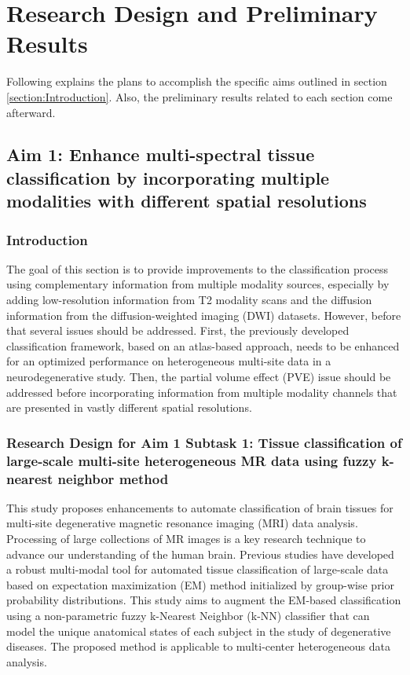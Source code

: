 \section{Research Design and Preliminary Results}
Following explains the plans to accomplish the specific aims outlined in section \ref{section:Introduction}. Also, the preliminary results related to each section come afterward.

\subsection{Aim 1: Enhance multi-spectral tissue classification by incorporating multiple modalities with different spatial resolutions}
\label{section:Aim1ResearchDesign}

\subsubsection{Introduction}
\label{section:Aim1Intro}
The goal of this section is to provide improvements to the classification process using complementary information from multiple modality sources, especially by adding low-resolution information from T2 modality scans and  the diffusion information from the diffusion-weighted imaging (DWI) datasets.
However, before that several issues should be addressed. First, the previously developed classification framework, based on an atlas-based approach, needs to be enhanced for an optimized performance on heterogeneous multi-site data in a neurodegenerative study. Then, the partial volume effect (PVE) issue should be addressed before incorporating information from multiple modality channels that are presented in vastly different spatial resolutions.

\subsubsection{Research Design for Aim 1 Subtask 1: Tissue classification of large-scale multi-site heterogeneous MR data using fuzzy k-nearest neighbor method}
\label{section:Aim1Subtask1ResearchDesign}

This study proposes enhancements to automate classification of brain tissues for multi-site degenerative magnetic resonance imaging (MRI) data analysis.
Processing of large collections of MR images is a key research technique to advance our understanding of the human brain. Previous studies have developed a robust multi-modal tool for automated tissue classification of large-scale data based on expectation maximization (EM) method initialized by group-wise prior probability distributions.
This study aims to augment the EM-based classification using a non-parametric fuzzy k-Nearest Neighbor (k-NN) classifier that can model the unique anatomical states of each subject in the study of degenerative diseases. The proposed method is applicable to multi-center heterogeneous data analysis.

